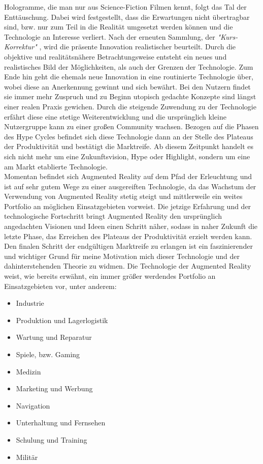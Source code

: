 Hologramme, die man nur aus Science-Fiction Filmen kennt, 
folgt das Tal der Enttäuschung. Dabei wird festgestellt, dass die Erwartungen nicht übertragbar sind, bzw. nur zum Teil in die Realität 
umgesetzt werden können und die Technologie an Interesse verliert. Nach der erneuten Sammlung, der \textit{"Kurs-Korrektur"} 
\cite{hypecycle.2019o}, wird die präsente Innovation realistischer beurteilt. 
Durch die objektive und realitätsnähere Betrachtungsweise entsteht ein neues und realistisches Bild der Möglichkeiten, als auch 
der Grenzen der Technologie. Zum Ende hin geht die ehemals neue Innovation in eine routinierte Technologie über, wobei diese an 
Anerkennung gewinnt und sich bewährt. Bei den Nutzern findet sie immer mehr Zuspruch und zu Beginn utopisch gedachte Konzepte sind
längst einer realen Praxis gewichen. Durch die steigende Zuwendung zu der Technologie erfährt diese eine stetige Weiterentwicklung
und die ursprünglich kleine Nutzergruppe kann zu einer großen Community wachsen. Bezogen auf die Phasen des Hype Cycles befindet sich diese 
Technologie dann an der Stelle des Plateaus der Produktivität und bestätigt die Marktreife. Ab diesem Zeitpunkt handelt es sich nicht mehr 
um eine Zukunftsvision, Hype oder Highlight, sondern um eine am Markt etablierte Technologie.
\\ 
\linebreak                                      %
Momentan befindet sich Augmented Reality auf dem Pfad der Erleuchtung und ist auf sehr gutem Wege zu einer ausgereiften Technologie, 
da das Wachstum der Verwendung von Augmented Reality stetig steigt und mittlerweile ein weites Portfolio an möglichen Einsatzgebieten 
vorweist. Die jetzige Erfahrung und der technologische Fortschritt bringt Augmented Reality den ursprünglich angedachten Visionen und Ideen 
einen Schritt näher, sodass in naher Zukunft die letzte Phase, das Erreichen des Plateaus der Produktivität erzielt werden kann. Den finalen 
Schritt der endgültigen Marktreife zu erlangen ist ein faszinierender und wichtiger Grund für meine Motivation mich dieser Technologie und 
der dahinterstehenden Theorie zu widmen. 
Die Technologie der Augmented Reality weist, wie bereits erwähnt, ein immer größer werdendes Portfolio an Einsatzgebieten vor, unter anderem: 
\begin{itemize}
    \item Industrie 
    \item Produktion und Lagerlogistik
    \item Wartung und Reparatur
    \item Spiele, bzw. Gaming 
    \item Medizin
    \item Marketing und Werbung
    \item Navigation
    \item Unterhaltung und Fernsehen 
    \item Schulung und Training
    \item Militär
\end{itemize} 
